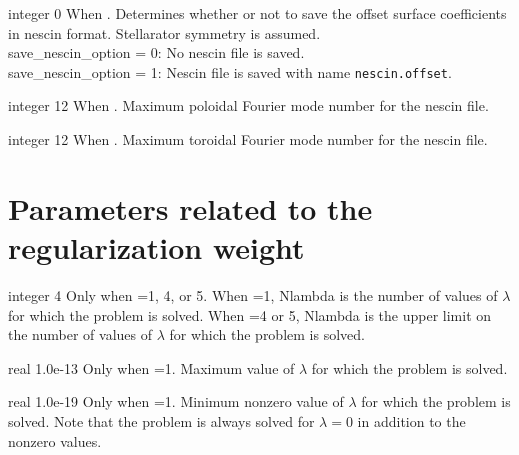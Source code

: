 \myhrule

{integer}
{0}
{When .}
{Determines whether or not to save the offset surface coefficients in nescin format. Stellarator symmetry is assumed. \\
{\ttfamily save\_nescin\_option} = 0: No nescin file is saved. \\
{\ttfamily save\_nescin\_option} = 1: Nescin file is saved with name \texttt{nescin.offset}. }

\myhrule

{integer}
{12}
{When . }
{Maximum poloidal Fourier mode number for the nescin file.}

\myhrule

{integer}
{12}
{When .}
{Maximum toroidal Fourier mode number for the nescin file.}


\section{Parameters related to the regularization weight}

{integer}
{4}
{Only when =1, 4, or 5.}
{When =1, {\ttfamily Nlambda} is the number of values of $\lambda$ for which the problem is solved.
When =4 or 5, {\ttfamily Nlambda} is the upper limit on the number of values of $\lambda$ for which the problem is solved.}

\myhrule

{real}
{1.0e-13}
{Only when =1.}
{Maximum value of $\lambda$ for which the problem is solved.}

\myhrule

{real}
{1.0e-19}
{Only when =1.}
{Minimum nonzero value of $\lambda$ for which the problem is solved.
Note that the problem is always solved for $\lambda=0$ in addition to
the nonzero values.}

\myhrule

